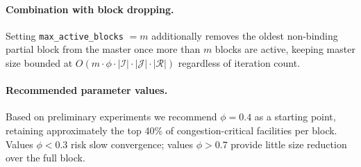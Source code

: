 \paragraph{Combination with block dropping.}
Setting \texttt{max\_active\_blocks} $= m$ additionally removes the
oldest non-binding partial block from the master once more than $m$
blocks are active, keeping master size bounded at
$O(m\cdot\phi\cdot|\mathcal{I}|\cdot|\mathcal{J}|\cdot|\mathcal{R}|)$
regardless of iteration count.

\paragraph{Recommended parameter values.}
Based on preliminary experiments we recommend $\phi = 0.4$ as a
starting point, retaining approximately the top 40\% of
congestion-critical facilities per block.
Values $\phi < 0.3$ risk slow convergence; values $\phi > 0.7$
provide little size reduction over the full block.

%
%
